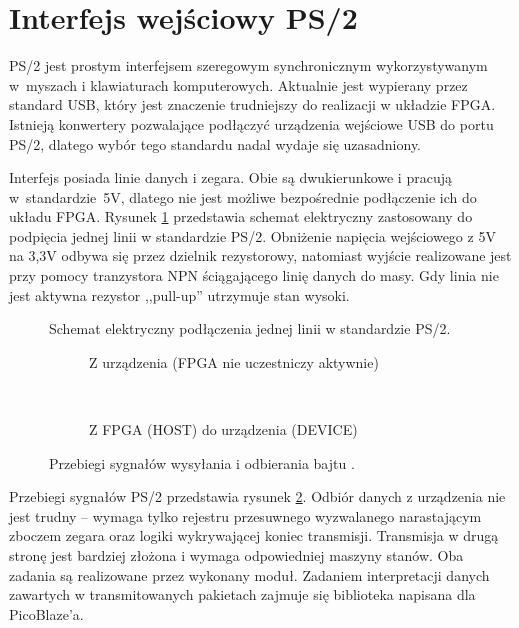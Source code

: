 
\rozdzial

\section{Interfejs wejściowy PS/2}
\label{ps2}


PS/2 jest prostym interfejsem szeregowym synchronicznym wykorzystywanym w~myszach i klawiaturach komputerowych. Aktualnie jest wypierany przez standard USB, który jest znaczenie trudniejszy do realizacji w układzie FPGA. Istnieją konwertery pozwalające podłączyć urządzenia wejściowe USB do portu PS/2, dlatego wybór tego standardu nadal wydaje się uzasadniony.


Interfejs posiada linie danych i zegara. Obie są dwukierunkowe i pracują w~standardzie~5V, dlatego nie jest możliwe bezpośrednie podłączenie ich do układu FPGA. Rysunek \ref{PS2Electrical} przedstawia schemat elektryczny zastosowany do podpięcia jednej linii w standardzie PS/2. Obniżenie napięcia wejściowego z 5V na 3,3V odbywa się przez dzielnik rezystorowy, natomiast wyjście realizowane jest przy pomocy tranzystora NPN ściągającego linię danych do masy. Gdy linia nie jest aktywna rezystor ,,pull-up'' utrzymuje stan wysoki.


\begin{figure}[h]	
	\centering
	\caption{ Schemat elektryczny podłączenia jednej linii w standardzie PS/2. }
	\label{PS2Electrical}
\end{figure}

\begin{figure}[htb]
	\centering
	\begin{subfigure}[b]{6cm}
		\caption{ Z urządzenia (FPGA nie uczestniczy aktywnie) }
	\end{subfigure}
	~
	\begin{subfigure}[b]{7.5cm}
		\caption{ Z FPGA (HOST) do urządzenia (DEVICE) }
	\end{subfigure}
	\caption{ Przebiegi sygnałów wysyłania i odbierania bajtu \cite{PS2eng}. }
	\label{PS2Signals}
\end{figure}

Przebiegi sygnałów PS/2 przedstawia rysunek \ref{PS2Signals}. Odbiór danych z urządzenia nie jest trudny -- wymaga tylko rejestru przesuwnego wyzwalanego narastającym zboczem zegara oraz logiki wykrywającej koniec transmisji. Transmisja w drugą stronę jest bardziej złożona i wymaga odpowiedniej maszyny stanów. Oba zadania są realizowane przez wykonany moduł. Zadaniem interpretacji danych zawartych w transmitowanych pakietach zajmuje się biblioteka napisana dla PicoBlaze'a.

